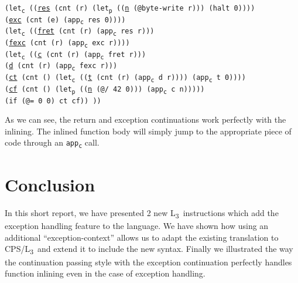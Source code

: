\documentclass[12pt,a4paper]{article}
\newcommand{\lang}{L\textsubscript{3}~}
\newcommand{\cps}[3]{\texttt{\textcolor{BurntOrange}{#1}#2\textcolor{BurntOrange}{#3}}}
\newcommand{\ts}[2]{#1\textsubscript{#2}}
\newcommand{\code}[1]{\texttt{#1}}
\newcommand{\letp}{\ts{let}{p}}
\newcommand{\letc}{\ts{let}{c}}
\newcommand{\appc}{\ts{app}{c}}
\begin{document}
\cps{(\letc~}{\cps{(}{(\underline{res} \cps{(cnt }{(r) \cps{(\letp~}{\cps{(}{(\underline{n} \cps{(@}{byte-write r}{)})}{)} \cps{(halt }{0}{)}}{)}}{)})\\
\hspace*{3.4em}(\underline{exc} \cps{(cnt }{(e) \cps{(\appc~}{res 0}{)}}{)})}{)}\\
\hspace*{2em}\cps{(\letc~}{\cps{(}{(\underline{fret} \cps{(cnt }{(r) \cps{(\appc~}{res r}{)}}{)})\\
\hspace*{5.4em}(\underline{fexc} \cps{(cnt }{(r) \cps{(\appc~}{exc r}{)}}{)})}{)}\\
\hspace*{4em}\cps{(\letc~}{\cps{(}{(\underline{c} \cps{(cnt }{(r) \cps{(\appc~}{fret r}{)}}{)})\\
\hspace*{7.4em}(\underline{d} \cps{(cnt }{(r) \cps{(\appc~}{fexc r}{)}}{)})\\
\hspace*{7.4em}(\underline{ct} \cps{(cnt }{() \cps{(\letc~}{\cps{(}{(\underline{t} \cps{(cnt }{(r) \cps{(\appc~}{d r}{)}}{)})}{)} \cps{(\appc~}{t 0}{)}}{)}}{)})\\
\hspace*{7.4em}(\underline{cf} \cps{(cnt }{() \cps{(\letp~}{\cps{(}{(\underline{n} \cps{(@}{/ 42 0}{)})}{)} \cps{(\appc~}{c n}{)}}{)}}{)})}{)}\\
\hspace*{6em}\cps{(if (@}{= 0 0}{) ct cf)}}{)}
}{)}}{)}

As we can see, the return and exception continuations work perfectly with the inlining. The inlined function body will simply jump to the appropriate piece of code through an \code{\appc} call.

\section*{Conclusion}

In this short report, we have presented 2 new \lang instructions which add the exception handling feature to the language. We have shown how using an additional ``exception-context'' allows us to adapt the existing translation to CPS/\lang and extend it to include the new syntax. Finally we illustrated the way the continuation passing style with the exception continuation perfectly handles function inlining even in the case of exception handling.
\end{document}

